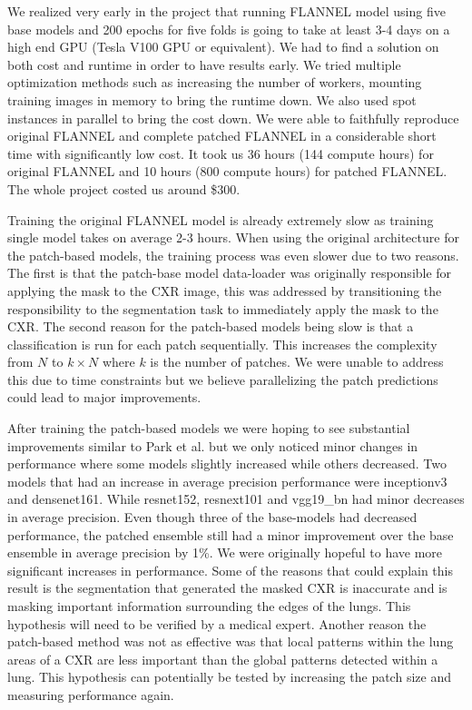 \documentclass{sigkddExp}
\begin{document}
We realized very early in the project that running FLANNEL model using five base
models and 200 epochs for five folds is going to take at least 3-4 days on a
high end GPU (Tesla V100 GPU or equivalent). We had to find a solution on both
cost and runtime in order to have results early. We tried multiple optimization
methods such as increasing the number of workers, mounting training images in
memory to bring the runtime down. We also used spot instances in parallel to
bring the cost down. We were able to faithfully reproduce original FLANNEL and
complete patched FLANNEL in a considerable short time with significantly low
cost. It took us 36 hours (144 compute hours) for original FLANNEL and 10 hours
(800 compute hours) for patched FLANNEL. The whole project costed us around
\$300.

Training the original FLANNEL model is already extremely slow as training single
model takes on average 2-3 hours. When using the original architecture for the
patch-based models, the training process was even slower due to two reasons. The
first is that the patch-base model data-loader was originally responsible for
applying the mask to the CXR image, this was addressed by transitioning the
responsibility to the segmentation task to immediately apply the mask to the
CXR. The second reason for the patch-based models being slow is that a
classification is run for each patch sequentially. This increases the complexity
from $N$ to $k\times N$ where $k$ is the number of patches. We were unable to
address this due to time constraints but we believe parallelizing the patch
predictions could lead to major improvements.

After training the patch-based models we were hoping to see substantial
improvements similar to Park et al. but we only noticed minor changes in
performance where some models slightly increased while others decreased. Two
models that had an increase in average precision performance were inceptionv3
and densenet161. While resnet152, resnext101 and vgg19\_bn had minor decreases
in average precision. Even though three of the base-models had decreased
performance, the patched ensemble still had a minor improvement over the base
ensemble in average precision by 1\%. We were originally hopeful to have more
significant increases in performance. Some of the reasons that could explain
this result is the segmentation that generated the masked CXR is inaccurate and
is masking important information surrounding the edges of the lungs. This
hypothesis will need to be verified by a medical expert. Another reason the
patch-based method was not as effective was that local patterns within the lung
areas of a CXR are less important than the global patterns detected within a
lung. This hypothesis can potentially be tested by increasing the patch size and
measuring performance again.
\end{document}
